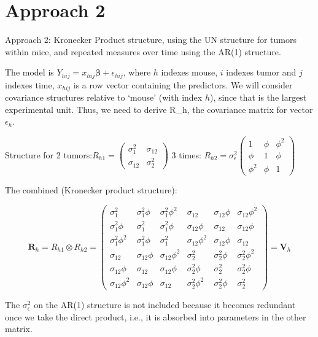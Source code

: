 \documentclass[
  9pt,
  ignorenonframetext,
]{beamer}
\begin{document}
\hypertarget{approach-2}{%
\section{Approach 2}\label{approach-2}}

\begin{frame}{Approach 2:}
\protect\hypertarget{approach-2-1}{}
Kronecker Product structure, using the UN structure for tumors within
mice, and repeated measures over time using the AR(1) structure.

The model is \(Y_{hij}=x_{hij} {\pmb \beta}+\epsilon_{hij}\), where
\(h\) indexes mouse, \(i\) indexes tumor and \(j\) indexes time,
\(x_{hij}\) is a row vector containing the predictors. We will consider
covariance structures relative to `mouse' (with index \(h\)), since that
is the largest experimental unit. Thus, we need to derive R\_h, the
covariance matrix for vector \(\epsilon_h\).

Structure for 2
tumors:\(R_{h1}=\begin{pmatrix} \sigma_1^2 & \sigma_{12} \\ \sigma_{12} & \sigma_2^2 \end{pmatrix}\)
3 times:
\(R_{h2}=\sigma_\epsilon^2 \begin{pmatrix} 1 & \phi & \phi^2 \\ \phi&1 & \phi \\ \phi^2 & \phi&1 \end{pmatrix}\)
\end{frame}

\begin{frame}{}
\protect\hypertarget{section-3}{}
The combined (Kronecker product structure):

\[
\pmb R_h = R_{h1} \otimes R_{h2} =
\begin{pmatrix}
\sigma_1^2 & \sigma_1^2 \phi & \sigma_1^2 \phi^2 & \sigma_{12}  & \sigma_{12}  \phi & \sigma_{12}  \phi^2  \\
\sigma_1^2 \phi & \sigma_1^2 & \sigma_1^2 \phi & \sigma_{12}  \phi & \sigma_{12}  & \sigma_{12}  \phi  \\ 
\sigma_1^2 \phi^2 & \sigma_1^2 \phi & \sigma_1^2 & \sigma_{12}  \phi^2 & \sigma_{12}  \phi & \sigma_{12}   \\  
\sigma_{12}  & \sigma_{12}  \phi & \sigma_{12}  \phi^2 & \sigma_2^2 & \sigma_2^2 \phi & \sigma_2^2 \phi^2  \\  
\sigma_{12}  \phi & \sigma_{12}  & \sigma_{12}  \phi & \sigma_2^2 \phi & \sigma_2^2 & \sigma_2^2 \phi  \\ 
\sigma_{12}  \phi^2 & \sigma_{12}  \phi & \sigma_{12}  & \sigma_2^2 \phi^2 & \sigma_2^2 \phi & \sigma_2^2 
\end{pmatrix} = \pmb V_h
\]

The \(\sigma_\epsilon^2\) on the AR(1) structure is not included because
it becomes redundant once we take the direct product, i.e., it is
absorbed into parameters in the other matrix.
\end{frame}
\end{document}
